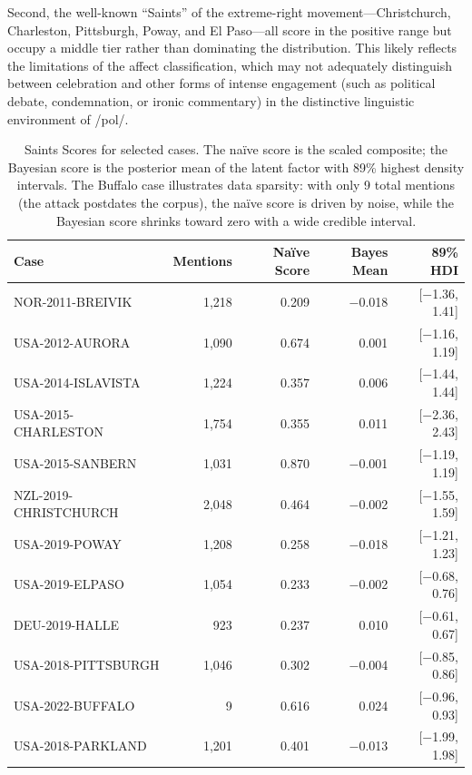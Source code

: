 \documentclass[12pt]{article}
\begin{document}
Second, the well-known ``Saints'' of the extreme-right movement---Christchurch, Charleston, Pittsburgh, Poway, and El Paso---all score in the positive range but occupy a middle tier rather than dominating the distribution. This likely reflects the limitations of the affect classification, which may not adequately distinguish between celebration and other forms of intense engagement (such as political debate, condemnation, or ironic commentary) in the distinctive linguistic environment of /pol/.

\begin{table}[htbp]
    \centering
    \small
    \begin{tabular}{lrrrr}
    \toprule
    \textbf{Case} & \textbf{Mentions} & \textbf{Na\"ive Score} & \textbf{Bayes Mean} & \textbf{89\% HDI} \\
    \midrule
    NOR-2011-BREIVIK     & 1,218 & 0.209 & $-$0.018 & [$-$1.36, 1.41] \\
    USA-2012-AURORA       & 1,090 & 0.674 &    0.001 & [$-$1.16, 1.19] \\
    USA-2014-ISLAVISTA    & 1,224 & 0.357 &    0.006 & [$-$1.44, 1.44] \\
    USA-2015-CHARLESTON   & 1,754 & 0.355 &    0.011 & [$-$2.36, 2.43] \\
    USA-2015-SANBERN      & 1,031 & 0.870 & $-$0.001 & [$-$1.19, 1.19] \\
    NZL-2019-CHRISTCHURCH & 2,048 & 0.464 & $-$0.002 & [$-$1.55, 1.59] \\
    USA-2019-POWAY        & 1,208 & 0.258 & $-$0.018 & [$-$1.21, 1.23] \\
    USA-2019-ELPASO       & 1,054 & 0.233 & $-$0.002 & [$-$0.68, 0.76] \\
    DEU-2019-HALLE        &   923 & 0.237 &    0.010 & [$-$0.61, 0.67] \\
    USA-2018-PITTSBURGH   & 1,046 & 0.302 & $-$0.004 & [$-$0.85, 0.86] \\
    USA-2022-BUFFALO      &     9 & 0.616 &    0.024 & [$-$0.96, 0.93] \\
    USA-2018-PARKLAND     & 1,201 & 0.401 & $-$0.013 & [$-$1.99, 1.98] \\
    \bottomrule
    \end{tabular}
    \caption{Saints Scores for selected cases. The na\"ive score is the scaled composite; the Bayesian score is the posterior mean of the latent factor with 89\% highest density intervals. The Buffalo case illustrates data sparsity: with only 9 total mentions (the attack postdates the corpus), the na\"ive score is driven by noise, while the Bayesian score shrinks toward zero with a wide credible interval.}
    \label{tab:scores}
\end{table}
\end{document}
